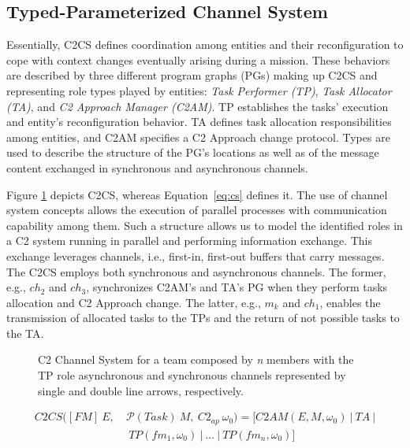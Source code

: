 \subsection{Typed-Parameterized Channel System}
\label{sec:channelSystem}

Essentially, C2CS defines coordination among entities and their reconfiguration to cope with context changes eventually arising during a mission. These behaviors are described by three different program graphs (PGs) making up C2CS and representing role types played by entities: \textit{Task Performer (TP)}, \textit{Task Allocator (TA)}, and \textit{C2 Approach Manager (C2AM)}. TP establishes the tasks' execution and entity's reconfiguration behavior. TA defines task allocation responsibilities among entities, and C2AM specifies a C2 Approach change protocol. Types are used to describe the structure of the PG's locations as well as of the message content exchanged in synchronous and asynchronous channels. 

Figure \ref{fig:cs} depicts C2CS, whereas Equation~\ref{eq:cs} defines it. The use of channel system concepts allows the execution of parallel processes with communication capability among them. Such a structure allows us to model the identified roles in a C2 system running in parallel and performing information exchange. This exchange leverages channels, i.e., first-in, first-out buffers that carry messages. The C2CS employs both synchronous and asynchronous channels. The former, e.g., $ch_2$ and $ch_3$, synchronizes C2AM's and TA's PG when they perform tasks allocation and C2 Approach change. The latter, e.g., $m_k$ and $ch_1$, enables the transmission of allocated tasks to the TPs and the return of not possible tasks to the TA. 

\begin{figure}[ht]
    \centering
    \scalebox{.8}{}
    \caption{C2 Channel System for a team composed by \textit{n} members with the TP role asynchronous and synchronous channels represented by single and double line arrows, respectively.}
    \label{fig:cs}
\end{figure}


\begin{equation}
    \label{eq:cs}
    \begin{split}
    C2CS([FM]\ E,\ &  \mathcal{P}(Task)\ M,\ C2_{ap}\ \omega_0) = [C2AM(E, M,\omega_0)\ |\ TA\ | \\ & \ TP(fm_1, \omega_0)\ |\ ...\ |\ TP(fm_n, \omega_0)]
    \end{split}
\end{equation}


